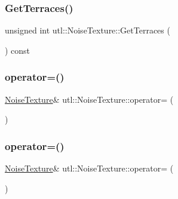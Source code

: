\mbox{\label{classutl_1_1_noise_texture_a41606f60346e598d1fb1d426f2a28a2d}} 
\subsubsection{\texorpdfstring{Get\+Terraces()}{GetTerraces()}}
{\footnotesize\ttfamily unsigned int utl\+::\+Noise\+Texture\+::\+Get\+Terraces (\begin{DoxyParamCaption}{ }\end{DoxyParamCaption}) const}

\mbox{\label{classutl_1_1_noise_texture_ac571db7b1fe31ecfea09f90967561c2e}} 
\subsubsection{\texorpdfstring{operator=()}{operator=()}\hspace{0.1cm}{\footnotesize\ttfamily [1/2]}}
{\footnotesize\ttfamily \mbox{\hyperlink{classutl_1_1_noise_texture}{Noise\+Texture}}\& utl\+::\+Noise\+Texture\+::operator= (\begin{DoxyParamCaption}\item[{const \mbox{\hyperlink{classutl_1_1_noise_texture}{Noise\+Texture}} \&}]{ }\end{DoxyParamCaption})\hspace{0.3cm}{\ttfamily [delete]}}

\mbox{\label{classutl_1_1_noise_texture_ada8e81c7343b16b7299e368857f22a21}} 
\subsubsection{\texorpdfstring{operator=()}{operator=()}\hspace{0.1cm}{\footnotesize\ttfamily [2/2]}}
{\footnotesize\ttfamily \mbox{\hyperlink{classutl_1_1_noise_texture}{Noise\+Texture}}\& utl\+::\+Noise\+Texture\+::operator= (\begin{DoxyParamCaption}\item[{\mbox{\hyperlink{classutl_1_1_noise_texture}{Noise\+Texture}} \&\&}]{ }\end{DoxyParamCaption})\hspace{0.3cm}{\ttfamily [default]}}

